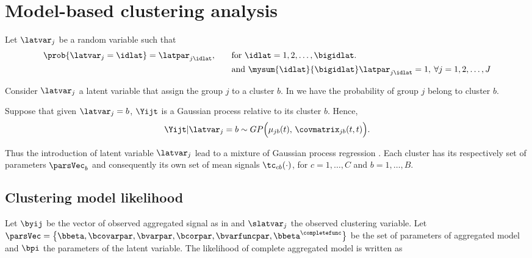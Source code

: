 \section{Model-based clustering analysis}
\label{sec:clustering}

Let $\latvar_j$ be a random variable such that
\begin{align}
  \label{eq:problatent}
  \prob{\latvar_j = \idlat} = \latpar_{j\idlat},
  \qquad
  &\text{for }
    \idlat = 1,2,\dots,\bigidlat. \\
  &\text{and } \mysum{\idlat}{\bigidlat} \latpar_{j\idlat} = 1, \: \forall j = 1,2,\dots,J \nonumber
\end{align}

\noindent Consider $\latvar_j$ a latent variable that assign the group $j$ to a cluster $b$. In  we have the probability of group $j$ belong to cluster $b$.

Suppose that given $\latvar_j = b$, $\Yijt$ is a Gaussian process relative to its cluster $b$. Hence,
\begin{equation}
  \Yijt | \latvar_j = b
  \sim
  GP
  \Bigl(
  \mu_{jb}(t) ,\,
  \covmatrix_{jb}(t,t)
  \Bigr).
\end{equation}

Thus the introduction of latent variable $\latvar_j$ lead to a mixture of Gaussian process regression \cite{shi2005hierarchical}. Each cluster has its respectively set of parameters $\parsVec_b$ and consequently its own set of mean signals $\tc_{cb}(\cdot)$, for $c=1,\dots,C$ and $b=1,\dots,B$.

\subsection{Clustering model likelihood}

Let $\byij$ be the vector of observed aggregated signal as in  and $\slatvar_j$ the observed clustering variable.
Let $\parsVec = \big\{ \bbeta, \bcovarpar, \bvarpar, \bcorpar, \bvarfuncpar, \bbeta^\completefunc \big\}$ be the set of parameters of aggregated model and $\bpi$ the parameters of the latent variable. The likelihood of complete aggregated model is written as

